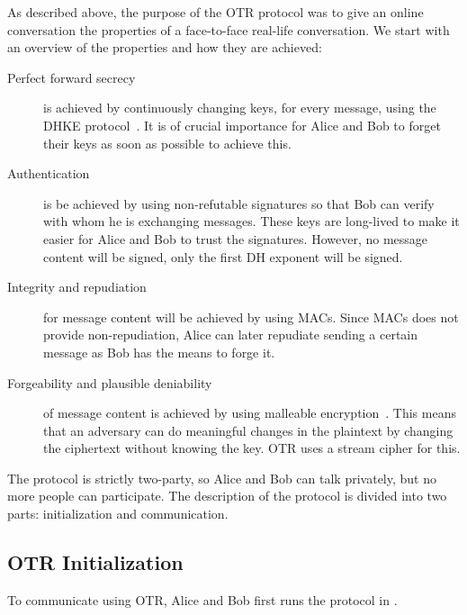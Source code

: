 As described above, the purpose of the \ac{OTR} protocol was to give an online 
conversation the properties of a face-to-face real-life conversation.
We start with an overview of the properties and how they are achieved:
\begin{description}
  \item[Perfect forward secrecy] is achieved by continuously changing keys, for 
    every message, using the \ac{DHKE} protocol~\cite{dh}.
    It is of crucial importance for Alice and Bob to forget their keys as soon 
    as possible to achieve this.

  \item[Authentication] is be achieved by using non-refutable signatures so 
    that Bob can verify with whom he is exchanging messages.
    These keys are long-lived to make it easier for Alice and Bob to trust the 
    signatures.
    However, no message content will be signed, only the first \ac{DH} exponent 
    will be signed.

  \item[Integrity and repudiation] for message content will be achieved by 
    using \acp{MAC}.
    Since \acp{MAC} does not provide non-repudiation, Alice can later 
    repudiate sending a certain message as Bob has the means to forge it.

  \item[Forgeability and plausible deniability] of message content is achieved 
    by using malleable encryption~\cite{nonmalleable}.
    This means that an adversary can do meaningful changes in the plaintext by 
    changing the ciphertext without knowing the key.
    \ac{OTR} uses a stream cipher for this.
\end{description}

The protocol is strictly two-party, so Alice and Bob can talk privately, but no 
more people can participate.
The description of the protocol is divided into two parts: initialization and 
communication.

\subsection{\acs{OTR} Initialization}

To communicate using \ac{OTR}, Alice and Bob first runs the protocol in 
.


